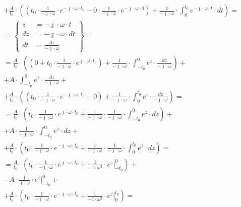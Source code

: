 \begin{task}
\begin{align*}
&+\frac{A}{t_0} \cdot \left(\left( t_0 \cdot \frac{1}{-\jmath \cdot \omega} \cdot e^{-\jmath \cdot \omega \cdot t_0} - 0 \cdot \frac{1}{-\jmath \cdot \omega} \cdot e^{-\jmath \cdot \omega \cdot 0}\right) + \frac{1}{-\jmath \cdot \omega} \cdot \int_{0 }^{t_0}  e^{-\jmath \cdot \omega \cdot t} \cdot dt\right)  = \\
&=\begin{Bmatrix}
z &= -\jmath \cdot \omega \cdot t \\
dz &= -\jmath \cdot \omega \cdot dt \\
dt &= \frac{dz}{-\jmath \cdot \omega}
\end{Bmatrix}=\\
&=\frac{A}{t_0} \cdot \left(\left( 0 + t_0 \cdot \frac{1}{-\jmath \cdot \omega} \cdot e^{\jmath \cdot \omega \cdot t_0}\right) + \frac{1}{-\jmath \cdot \omega} \cdot \int_{-t_0 }^{0} e^{z} \cdot \frac{dz}{-\jmath \cdot \omega}\right) + \\
&+ A \cdot \int_{-t_0 }^{0} e^{z} \cdot \frac{dz}{-\jmath \cdot \omega} + \\
&+\frac{A}{t_0} \cdot \left(\left( t_0 \cdot \frac{1}{-\jmath \cdot \omega} \cdot e^{-\jmath \cdot \omega \cdot t_0} - 0\right) + \frac{1}{-\jmath \cdot \omega} \cdot \int_{0 }^{t_0}  e^{z} \cdot \frac{dz}{-\jmath \cdot \omega}\right)  = \\
&=\frac{A}{t_0} \cdot \left(t_0 \cdot \frac{1}{-\jmath \cdot \omega} \cdot e^{\jmath \cdot \omega \cdot t_0} + \frac{1}{-\jmath \cdot \omega} \cdot \frac{1}{-\jmath \cdot \omega} \cdot \int_{-t_0 }^{0} e^{z} \cdot dz\right) + \\
&+ A \cdot \frac{1}{-\jmath \cdot \omega} \cdot \int_{-t_0 }^{0} e^{z} \cdot dz + \\
&+\frac{A}{t_0} \cdot \left( t_0 \cdot \frac{1}{-\jmath \cdot \omega} \cdot e^{-\jmath \cdot \omega \cdot t_0} + \frac{1}{-\jmath \cdot \omega} \cdot \frac{1}{-\jmath \cdot \omega} \cdot \int_{0 }^{t_0}  e^{z} \cdot dz\right)  = \\
&=\frac{A}{t_0} \cdot \left(t_0 \cdot \frac{1}{-\jmath \cdot \omega} \cdot e^{\jmath \cdot \omega \cdot t_0} + \frac{1}{-1 \cdot \omega^2} \cdot \left. e^{z} \right|_{-t_0 }^{0} \right) + \\
&- A \cdot \frac{1}{\jmath \cdot \omega} \cdot \left. e^{z} \right|_{-t_0 }^{0} + \\
&+\frac{A}{t_0} \cdot \left( t_0 \cdot \frac{1}{-\jmath \cdot \omega} \cdot e^{-\jmath \cdot \omega \cdot t_0} + \frac{1}{-1 \cdot \omega^2} \cdot \left. e^{z} \right|_{0 }^{t_0} \right)  = \\

\end{align*}
\end{task}
